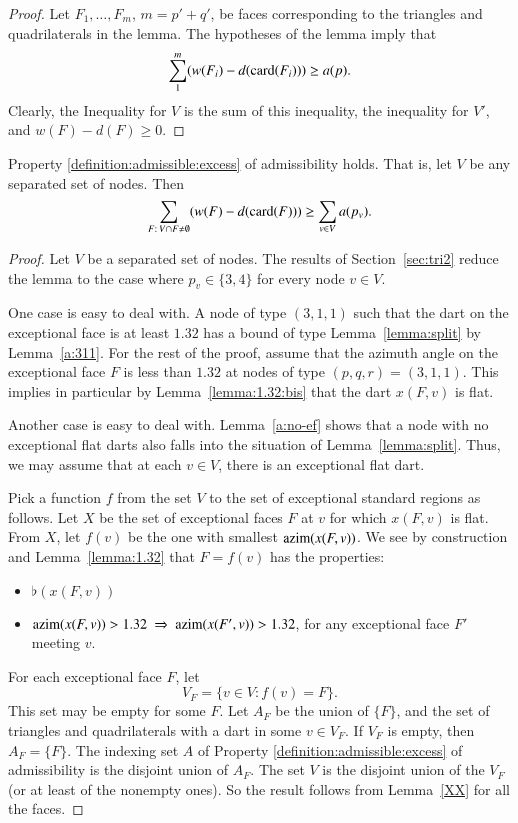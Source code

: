 \begin{proof}  Let $F_1,\ldots,F_m$, $m={p'+q'}$, be faces corresponding
to the triangles and quadrilaterals in the lemma.  The hypotheses
of the lemma imply that
    $$\sum_{1}^{m} (w(F_i) - d({\operatorname{card}}(F_i))) \ge a(p).$$
Clearly, the Inequality for $V$ is the sum of this inequality, the
inequality for $V'$, and $w(F)- d(F)\ge0$.
\end{proof}


\begin{lemma}  Property \ref{definition:admissible:excess}  of
admissibility holds.  That is, let $V$ be any separated set of
nodes. Then
        $$\sum_{F:\,V\cap F\ne\emptyset} (w(F) -d({\operatorname{card}}(F)))
            \ge \sum_{v\in V} a(p_v).$$
\end{lemma}

\begin{proof}  Let $V$ be a separated set of nodes.
The results of Section~\ref{sec:tri2} reduce the lemma to the case
where $p_v\in\{3,4\}$ for every node $v\in V$.


One case is easy to deal with.  A node of type $(3,1,1)$ such
that the dart on the exceptional face is at least $1.32$ has a
bound of type Lemma~\ref{lemma:split} by Lemma~\ref{a:311}.
For the rest of the proof, assume that the azimuth angle on
the exceptional face $F$ is less than $1.32$ at nodes of type
$(p,q,r)=(3,1,1)$. This implies in particular by
Lemma~\ref{lemma:1.32:bis} that the dart $x(F,v)$ is flat.

Another case is easy to deal with.  Lemma~\ref{a:no-ef}
shows that a node with no exceptional flat darts also
falls into the situation of Lemma~\ref{lemma:split}.
Thus, we may assume that at each $v\in V$, there is an exceptional
flat dart.

Pick a function $f$ from the set $V$ to the set of exceptional
standard regions as follows. Let $X$ be the set of exceptional faces
$F$ at $v$ for which $x(F,v)$ is flat.  From $X$, let $f(v)$ be the
one with smallest ${\operatorname{azim}}(x(F,v))$.  We see by construction and
Lemma~\ref{lemma:1.32} that $F = f(v)$ has the properties:
    \begin{itemize}
        \item $\flat(x(F,v))$
        \item $\azim(x(F,v)) > 1.32\ \Rightarrow\ \azim(x(F',v)) >
        1.32$, for any exceptional face $F'$ meeting $v$.
    \end{itemize}

For each exceptional face $F$, let
    $$V_F = \{ v\in V : f(v) = F\}.$$  This set may be empty for
some $F$.  Let $A_F$ be the union of $\{F\}$, and the set of
triangles and quadrilaterals with a dart in some $v\in V_F$.  If
$V_F$ is empty, then $A_F =\{F\}$.  The indexing set $A$ of Property
\ref{definition:admissible:excess} of admissibility is the disjoint
union of $A_F$.  The set $V$ is the disjoint union of the $V_F$ (or
at least of the nonempty ones). So the result follows from
Lemma~\ref{XX} for all the faces.
\end{proof}



